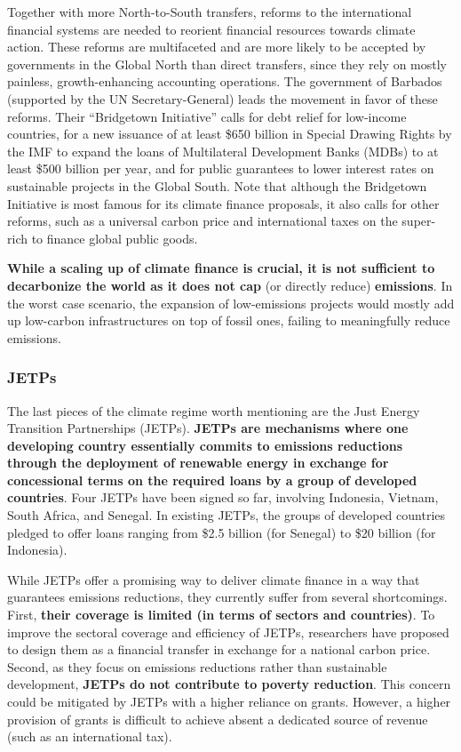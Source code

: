 \documentclass[12pt,english]{article}
\begin{document}
Together with more North-to-South transfers, reforms to the international financial systems are needed to reorient financial resources towards climate action. These reforms are multifaceted and are more likely to be accepted by governments in the Global North than direct transfers, since they rely on mostly painless, growth-enhancing accounting operations. The government of Barbados (supported by the UN Secretary-General) leads the movement in favor of these reforms. Their ``Bridgetown Initiative'' calls for debt relief for low-income countries, for a new issuance of at least \$650 billion in Special Drawing Rights by the IMF to expand the loans of Multilateral Development Banks (MDBs) to at least \$500 billion per year, and for public guarantees to lower interest rates on sustainable projects in the Global South.\cite{bridgetown_bridgetown_2025} Note that although the Bridgetown Initiative is most famous for its climate finance proposals, it also calls for other reforms, such as a universal carbon price and international taxes on the super-rich to finance global public goods. 

\textbf{While a scaling up of climate finance is crucial, it is not sufficient to decarbonize the world as it does not cap} (or directly reduce) \textbf{emissions}. In the worst case scenario, the expansion of low-emissions projects would mostly add up low-carbon infrastructures on top of fossil ones, failing to meaningfully reduce emissions.

\subsubsection{JETPs\label{subsubsec:jetp}}

The last pieces of the climate regime worth mentioning are the Just Energy Transition Partnerships (JETPs).\textbf{ JETPs are mechanisms where one developing country essentially commits to emissions reductions through the deployment of renewable energy in exchange for concessional terms on the required loans by a group of developed countries}. Four JETPs have been signed so far, involving Indonesia, Vietnam, South Africa, and Senegal.\cite{ha-duong_just_2023} In existing JETPs, the groups of developed countries pledged to offer loans ranging from \$2.5 billion (for Senegal) to \$20 billion (for Indonesia). 

While JETPs offer a promising way to deliver climate finance in a way that guarantees emissions reductions, they currently suffer from several shortcomings. First, \textbf{their coverage is limited (in terms of sectors and countries)}. To improve the sectoral coverage and efficiency of JETPs, researchers have proposed to design them as a financial transfer in exchange for a national carbon price.\cite{steckel_climate_2017} Second, as they focus on emissions reductions rather than sustainable development, \textbf{JETPs do not contribute to poverty reduction}. This concern could be mitigated by JETPs with a higher reliance on grants.\cite{bolton_why_2025} However, a higher provision of grants is difficult to achieve absent a dedicated source of revenue (such as an international tax).
\end{document}
